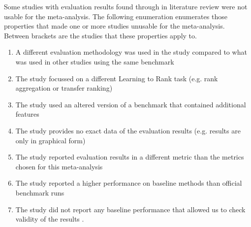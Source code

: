 Some studies with evaluation results found through in literature review were not usable for the meta-analysis. The following enumeration enumerates those properties that made one or more studies unusable for the meta-analysis. Between brackets are the studies that these properties apply to.

\begin{enumerate}
\item A different evaluation methodology was used in the study compared to what was used in other studies using the same benchmark \cite{Geng2011, Lin2012}
\item The study focussed on a different Learning to Rank task (e.g. rank aggregation or transfer ranking) \cite{De2011, De2010, Derhami2013, De2012, Chen2010, Ah-Pine2008, Wang2009c, De2013, Miao2013, Hoi2008, De2012b, Duh2011b, Argentini2012, Qin2010c, Volkovs2013, Desarkar2011, Pan2013, Lin2011b, Volkovs2012, Dammak2011}
\item The study used an altered version of a benchmark that contained additional features \cite{Bidoki2009, Ding2010}
\item The study provides no exact data of the evaluation results (e.g. results are only in graphical form) \cite{Wang2008, Wang2010, Xu2010, Kuo2009, Li2008, Xia2008, Zhou2011, Wu2011, Zhu2009, Karimzadehgan2011, Swersky2012, Pan2011, Ni2008, Ciaramita2008, Stewart2012, Petterson2009, Agarwal2010, Chang2009, Qin2008c, Adams2011, Sculley2009, Huang2008, Alejo2010, Sun2011, He2010b, Benbouzid2012, Geng2012, Chen2012, Xu2012, Shivaswamy2011}
\item The study reported evaluation results in a different metric than the metrics chosen for this meta-analysis \cite{Yu2009, Thuy2009, Pahikkala2009, Kersting2009, Mohan2011}
\item The study reported a higher performance on baseline methods than official benchmark runs \cite{Dubey2009, Banerjee2009, Peng2010b, Song2014, Bian2010, Bian2010b, Carvalho2008, Acharyya2012, Peng2010b, Tran2012, Asadi2013c}
\item The study did not report any baseline performance that allowed us to check validity of the results \cite{Chakrabarti2008, Wang2012b, Buffoni2011}.
\end{enumerate}

